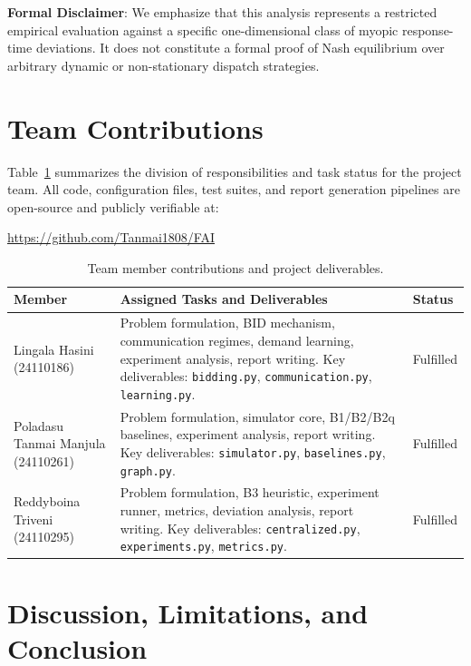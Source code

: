 \documentclass{article}
\begin{document}
\noindent\textbf{Formal Disclaimer}: We emphasize that this analysis represents a restricted empirical evaluation against a specific one-dimensional class of myopic response-time deviations. It does not constitute a formal proof of Nash equilibrium over arbitrary dynamic or non-stationary dispatch strategies.



\section{Team Contributions}
Table~\ref{tab:contributions} summarizes the division of responsibilities and task status for the project team. All code, configuration files, test suites, and report generation pipelines are open-source and publicly verifiable at:
\begin{center}\vspace{-4pt}
\url{https://github.com/Tanmai1808/FAI}
\vspace{-4pt}\end{center}

\begin{table}[h]
\centering\scriptsize
\setlength{\tabcolsep}{4pt}
\caption{Team member contributions and project deliverables.}
\label{tab:contributions}
\begin{tabular}{p{1.6in}p{3.35in}p{0.8in}}
\toprule
Member & Assigned Tasks and Deliverables & Status \\
\midrule
Lingala Hasini (24110186) & Problem formulation, BID mechanism, communication regimes, demand learning, experiment analysis, report writing. Key deliverables: \texttt{bidding.py}, \texttt{communication.py}, \texttt{learning.py}. & Fulfilled \\
Poladasu Tanmai Manjula (24110261) & Problem formulation, simulator core, B1/B2/B2q baselines, experiment analysis, report writing. Key deliverables: \texttt{simulator.py}, \texttt{baselines.py}, \texttt{graph.py}. & Fulfilled \\
Reddyboina Triveni (24110295) & Problem formulation, B3 heuristic, experiment runner, metrics, deviation analysis, report writing. Key deliverables: \texttt{centralized.py}, \texttt{experiments.py}, \texttt{metrics.py}. & Fulfilled \\
\bottomrule
\end{tabular}
\end{table}

\section{Discussion, Limitations, and Conclusion}
\end{document}
